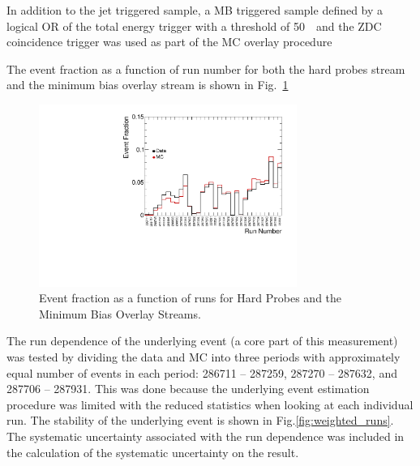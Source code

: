 In addition to the jet triggered sample, a MB triggered sample defined by a logical OR of the total energy trigger with a threshold of 50~\GeV\ and the ZDC coincidence trigger was used as part of the MC overlay procedure

The event fraction as a function of run number  for both the hard probes stream and the minimum bias overlay stream is shown in Fig.~\ref{fig:evnt_fraction}

 \begin{figure}[h]
    \centerline{
       \includegraphics[width=0.75\textwidth]{figures_general/EventPercentages.pdf}
    }
    \caption{Event fraction as a function of runs for Hard Probes and the Minimum Bias Overlay Streams.}
    \label{fig:evnt_fraction}
 \end{figure}

The run dependence of the underlying event (a core part of this measurement) was tested by dividing the data and MC into three periods with approximately equal number of events in each period: 286711 -- 287259, 287270 -- 287632, and 287706 -- 287931. This was done because the underlying event estimation procedure was limited with the reduced statistics when looking at each individual run. The stability of the underlying event is shown in Fig.\ref{fig:weighted_runs}. The systematic uncertainty associated with the run dependence was included in the calculation of the systematic uncertainty on the result.

